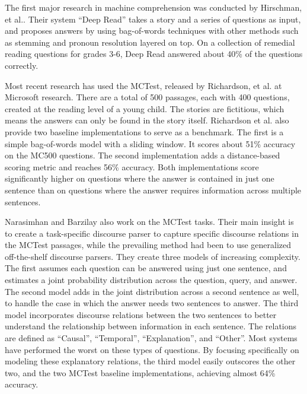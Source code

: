 \documentclass[pageno]{jpaper}
\begin{document}
The first major research in machine comprehension was conducted by Hirschman,
et al.\cite{Hirschman1999}. Their system ``Deep Read'' takes a story and a
series of questions as input, and proposes answers by using bag-of-words
techniques with other methods such as stemming and pronoun resolution layered
on top. On a collection of remedial reading questions for grades 3-6, Deep Read
answered about 40\% of the questions correctly.

Most recent research has used the MCTest\cite{Richardson2013}, released by
Richardson, et al. at Microsoft research. There are a total of 500 passages,
each with 400 questions, created at the reading level of a young child. The
stories are fictitious, which means the answers can only be found in the story
itself. Richardson et al. also provide two baseline implementations to serve as
a benchmark. The first is a simple bag-of-words model with a sliding window. It
scores about 51\% accuracy on the MC500 questions. The second implementation
adds a distance-based scoring metric and reaches 56\% accuracy. Both
implementations score significantly higher on questions where the answer is
contained in just one sentence than on questions where the answer requires
information across multiple sentences.

Narasimhan and Barzilay\cite{Narasimhan2015} also work on the MCTest tasks.
Their main insight is to create a task-specific discourse parser to capture
specific discourse relations in the MCTest passages, while the prevailing
method had been to use generalized off-the-shelf discourse parsers. They create
three models of increasing complexity. The first assumes each question can be
answered using just one sentence, and estimates a joint probability
distribution across the question, query, and answer. The second model adds in
the joint distribution across a second sentence as well, to handle the case in
which the answer needs two sentences to answer. The third model incorporates
discourse relations between the two sentences to better understand the
relationship between information in each sentence. The relations are defined as
``Causal'', ``Temporal'', ``Explanation'', and ``Other''. Most systems have
performed the worst on these types of questions. By focusing specifically on
modeling these explanatory relations, the third model easily outscores the
other two, and the two MCTest baseline implementations, achieving almost 64\%
accuracy.
\end{document}
